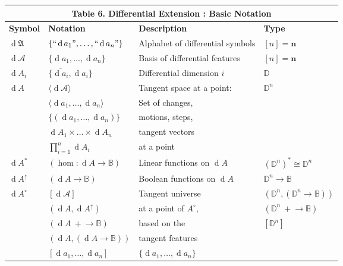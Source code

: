 \documentclass[12pt]{article}
\begin{document}
\begin{center}\begin{tabular}{|l|l|l|l|}
\multicolumn{4}{c}{\textbf{Table 6.  Differential Extension : Basic Notation}} \\[8pt]
\hline

\textbf{Symbol} &
\textbf{Notation} &
\textbf{Description} &
\textbf{Type} \\[4pt]
\hline

$\operatorname{d}\mathfrak{A}$ &
$\{ ``\operatorname{d}a_1", \ldots, ``\operatorname{d}a_n" \}$ &
Alphabet of differential symbols &
$[n] = \mathbf{n}$ \\[4pt]
\hline

$\operatorname{d}\mathcal{A}$ &
$\{ \operatorname{d}a_1, \ldots, \operatorname{d}a_n \}$ &
Basis of differential features &
$[n] = \mathbf{n}$ \\[4pt]
\hline

$\operatorname{d}A_i$ &
$\{ \overline{\operatorname{d}a_i}, \operatorname{d}a_i \}$ &
Differential dimension $i$ &
$\mathbb{D}$ \\[4pt]
\hline

$\operatorname{d}A$ &
$\langle \operatorname{d}\mathcal{A} \rangle$ &
Tangent space at a point: &
$\mathbb{D}^n$ \\[4pt]
&
$\langle \operatorname{d}a_1, \ldots, \operatorname{d}a_n \rangle$ &
Set of changes, &
\\[4pt]
&
$\{ (\operatorname{d}a_1, \ldots, \operatorname{d}a_n) \}$ &
motions, steps, &
\\[4pt]
&
$\operatorname{d}A_1 \times \ldots \times \operatorname{d}A_n$ &
tangent vectors &
\\[4pt]
&
$\textstyle \prod_{i=1}^n \operatorname{d}A_i$ &
at a point &
\\[4pt]
\hline

$\operatorname{d}A^*$ &
$(\operatorname{hom} : \operatorname{d}A \to \mathbb{B})$ &
Linear functions on $\operatorname{d}A$ &
$(\mathbb{D}^n)^* \cong \mathbb{D}^n$ \\[4pt]
\hline

$\operatorname{d}A^\uparrow$ &
$(\operatorname{d}A \to \mathbb{B})$ &
Boolean functions on $\operatorname{d}A$ &
$\mathbb{D}^n \to \mathbb{B}$ \\[4pt]
\hline

$\operatorname{d}A^\circ$ &
$[ \operatorname{d}\mathcal{A} ]$ &
Tangent universe &
$(\mathbb{D}^n, (\mathbb{D}^n \to \mathbb{B}))$ \\[4pt]
&
$(\operatorname{d}A, \operatorname{d}A^\uparrow)$ &
at a point of $A^\circ,$ &
$(\mathbb{D}^n\ +\!\to \mathbb{B})$ \\[4pt]
&
$(\operatorname{d}A\ +\!\to \mathbb{B})$ &
based on the &
$[\mathbb{D}^n]$ \\[4pt]
&
$(\operatorname{d}A, (\operatorname{d}A \to \mathbb{B}))$ &
tangent features &
\\[4pt]
&
$[ \operatorname{d}a_1, \ldots, \operatorname{d}a_n ]$ &
$\{ \operatorname{d}a_1, \ldots, \operatorname{d}a_n \}$ &
\\[4pt]
\hline
\end{tabular}\end{center}

\end{document}
